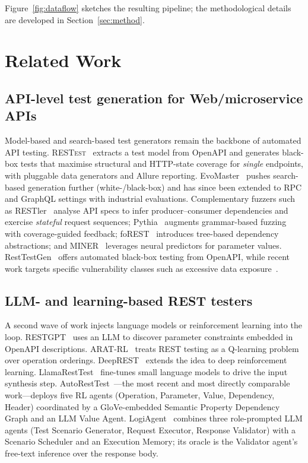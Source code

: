 \documentclass[conference]{IEEEtran}
\begin{document}
Figure~\ref{fig:dataflow} sketches the resulting pipeline; the
methodological details are developed in Section~\ref{sec:method}.



\section{Related Work}
\label{sec:related}

\subsection{API-level test generation for Web/microservice APIs}
Model-based and search-based test generators remain the backbone of automated API testing.
\textsc{RESTest}~\cite{martin2019restest} extracts a test model from OpenAPI and generates black-box tests that maximise structural and HTTP-state coverage for \emph{single} endpoints, with pluggable data generators and Allure reporting.
EvoMaster~\cite{arcuri2019restful} pushes search-based generation further (white-/black-box) and has since been extended to RPC and GraphQL settings with industrial evaluations.
Complementary fuzzers such as RESTler~\cite{atlidakis2019restler} analyse API specs to infer producer--consumer dependencies and exercise \emph{stateful} request sequences; Pythia~\cite{atlidakis2020pythia} augments grammar-based fuzzing with coverage-guided feedback; foREST~\cite{lin2022forest} introduces tree-based dependency abstractions; and MINER~\cite{lyu2023miner} leverages neural predictors for parameter values.
RestTestGen~\cite{viglianisi2020resttestgen} offers automated black-box testing from OpenAPI, while recent work targets specific vulnerability classes such as excessive data exposure~\cite{pan2023edefuzz}.

\subsection{LLM- and learning-based REST testers}
A second wave of work injects language models or reinforcement learning
into the loop.  RESTGPT~\cite{kim2024restgpt} uses an LLM to discover
parameter constraints embedded in OpenAPI descriptions.  ARAT-RL~\cite{kim2023adaptive}
treats REST testing as a Q-learning problem over operation orderings.
DeepREST~\cite{corradini2024deeprest} extends the idea to deep
reinforcement learning.  LlamaRestTest~\cite{llamaresttest2025}
fine-tunes small language models to drive the input synthesis step.
AutoRestTest~\cite{stennett2025autoresttest,kim2024multiagent}---the most
recent and most directly comparable work---deploys five RL agents
(Operation, Parameter, Value, Dependency, Header) coordinated by a
GloVe-embedded Semantic Property Dependency Graph and an LLM Value
Agent.  LogiAgent~\cite{zhang2025logiagent} combines three role-prompted
LLM agents (Test Scenario Generator, Request Executor, Response
Validator) with a Scenario Scheduler and an Execution Memory; its oracle
is the Validator agent's free-text inference over the response body.
\end{document}
